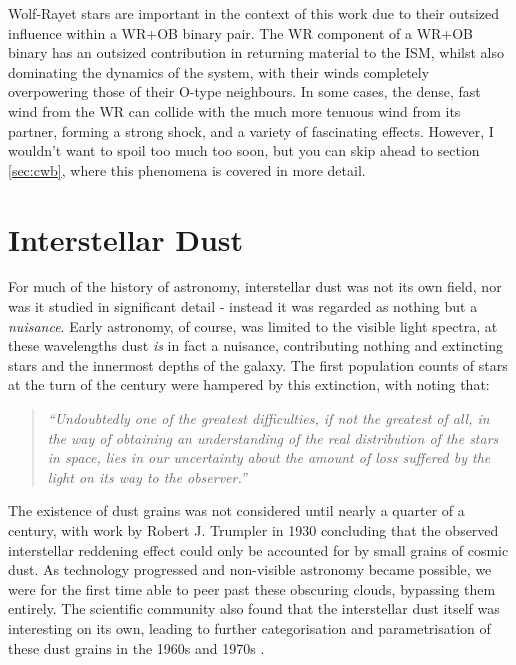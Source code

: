 


Wolf-Rayet stars are important in the context of this work due to their outsized influence within a WR+OB binary pair.
The WR component of a WR+OB binary has an outsized contribution in returning material to the ISM, whilst also dominating the dynamics of the system, with their winds completely overpowering those of their O-type neighbours.
In some cases, the dense, fast wind from the WR can collide with the much more tenuous wind from its partner, forming a strong shock, and a variety of fascinating effects.
However, I wouldn't want to spoil too much too soon, but you can skip ahead to section \ref{sec:cwb}, where this phenomena is covered in more detail.

\section{Interstellar Dust}
\label{sec:dust}

For much of the history of astronomy, interstellar dust was not its own field, nor was it studied in significant detail - instead it was regarded as nothing but a \emph{nuisance}.
Early astronomy, of course, was limited to the visible light spectra, at these wavelengths dust \emph{is} in fact a nuisance, contributing nothing and extincting stars and the innermost depths of the galaxy.
The first population counts of stars at the turn of the  century were hampered by this extinction, with \textcite{kapteynAbsorptionLightSpace1909} noting that:

\begin{quote}
  \textit{
    ``Undoubtedly one of the greatest difficulties, if not the greatest of all, in the way of obtaining an understanding of the real distribution of the stars in space, lies in our uncertainty about the amount of loss suffered by the light on its way to the observer.''
  }
\end{quote}

\noindent
The existence of dust grains was not considered until nearly a quarter of a century, with work by Robert J. Trumpler in 1930 concluding that the observed interstellar reddening effect could only be accounted for by small grains of cosmic dust.
As technology progressed and non-visible astronomy became possible, we were for the first time able to peer past these obscuring clouds, bypassing them entirely.
The scientific community also found that the interstellar dust itself was interesting on its own, leading to further categorisation and parametrisation of these dust grains in the 1960s and 1970s
\parencite[4-13]{whittetDustGalacticEnvironment2002}.


